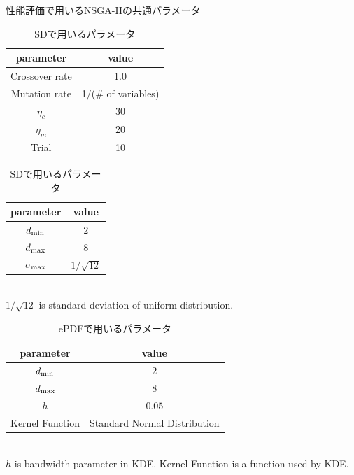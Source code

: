 \documentclass[../main/main]{subfiles}
\begin{document}
\begin{table}[htbp]
\begin{minipage}{0.4\hsize}
\begin{center}
\caption{性能評価で用いるNSGA-IIの共通パラメータ}
\label{tbl:condition}
\begin{tabular}{c|c}
\hline 
parameter & value \\
\hline 
Crossover rate & 1.0\\
Mutation rate & 1/(\# of variables)\\
$\eta_c$ & 30 \\
$\eta_m$ & 20 \\
Trial & 10\\
\hline
\end{tabular}
\end{center}
\end{minipage}
\begin{minipage}{0.59\hsize}
\centering
\caption{SDで用いるパラメータ}
\label{tbl:sd_condition}
\begin{tabular}{c|c}
\hline 
parameter & value \\
\hline 
$d_{\rm min}$ & $2$\\
$d_{\rm max}$ & $8$\\
$\sigma_{\rm max}$ & $1 / \sqrt{12}$ \\
\hline
\end{tabular}
\\
{\footnotesize $1 / \sqrt{12}$ is standard deviation of uniform distribution.}
\end{minipage}
\end{table}

\begin{table}[htbp]
\centering
\caption{ePDFで用いるパラメータ}
\label{tbl:pdf_condition}
\begin{tabular}{c|c}
\hline 
parameter & value \\
\hline 
$d_{\rm min}$ & $2$\\
$d_{\rm max}$ & $8$\\
$h$ & $0.05$ \\
Kernel Function & Standard Normal Distribution\\
\hline
\end{tabular}
\\
{\footnotesize $h$ is bandwidth parameter in KDE.}
{\footnotesize Kernel Function is a function used by KDE.}
\end{table}
\end{document}

